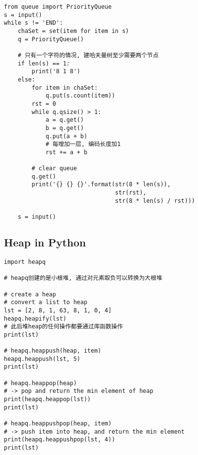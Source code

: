 \documentclass[../main]{subfiles}
\begin{document}
\begin{lstlisting}[style = Python]
from queue import PriorityQueue
s = input()
while s != 'END':
    chaSet = set(item for item in s)
    q = PriorityQueue()

    # 只有一个字符的情况, 建哈夫曼树至少需要两个节点
    if len(s) == 1:
        print('8 1 8')
    else:
        for item in chaSet:
            q.put(s.count(item))
        rst = 0
        while q.qsize() > 1:
            a = q.get()
            b = q.get()
            q.put(a + b)
            # 每增加一层, 编码长度加1
            rst += a + b
        
        # clear queue
        q.get()
        print('{} {} {}'.format(str(8 * len(s)),
                                str(rst),
                                str(8 * len(s) / rst)))

    s = input()
\end{lstlisting}

\subsection{Heap in Python}

\begin{lstlisting}[style = Python]
import heapq

# heapq创建的是小根堆, 通过对元素取负可以转换为大根堆

# create a heap
# convert a list to heap
lst = [2, 8, 1, 63, 8, 1, 0, 4]
heapq.heapify(lst)
# 此后堆heap的任何操作都要通过库函数操作
print(lst)

# heapq.heappush(heap, item)
heapq.heappush(lst, 5)
print(lst)

# heapq.heappop(heap)
# -> pop and return the min element of heap
print(heapq.heappop(lst))
print(lst)

# heapq.heappushpop(heap, item)
# -> push item into heap, and return the min element
print(heapq.heappushpop(lst, 4))
print(lst)
\end{lstlisting}
\end{document}
